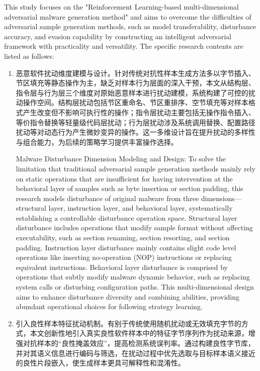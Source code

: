 This study focuses on the "Reinforcement Learning-based multi-dimensional adversarial malware generation method" and aims to overcome the difficulties of adversarial sample generation methods, such as model transferability, disturbance accuracy, and evasion capability by constructing an intelligent adversarial framework with practicality and versatility. The specific research contents are listed as follows:
\begin{enumerate} [label=\arabic*)] 
\item 恶意软件扰动维度建模与设计。针对传统对抗性样本生成方法多以字节插入、节区填充等静态操作为主，缺乏对样本行为层面的深入干预，本文从结构层、指令层与行为层三个维度对原始恶意样本进行扰动建模，系统构建了可控的扰动操作空间。结构层扰动包括节区重命名、节区重排序、空节填充等对样本格式产生改变但不影响可执行性的操作；指令层扰动主要包括无操作指令插入、等价指令替换等轻量级代码层扰动；行为层扰动涉及系统调用替换、配置路径扰动等对动态行为产生微妙变异的操作。这一多维设计旨在提升扰动的多样性与组合能力，为后续的策略学习提供丰富操作选择。

Malware Disturbance Dimension Modeling and Design: To solve the limitation that traditional adversarial sample generation methods mainly rely on static operations that are insufficient for having intervention at the behavioral layer of samples such as byte insertion or section padding, this research models disturbance of original malware from three dimensions—structural layer, instruction layer, and behavioral layer, systematically establishing a controllable disturbance operation space. Structural layer disturbance includes operations that modify sample format without affecting executability, such as section renaming, section resorting, and section padding. Instruction layer disturbance mainly contains slight code level operations like inserting no-operation (NOP) instructions or replacing equivalent instructions. Behavioral layer disturbance is comprised by operations that subtly modify malware dynamic behavior, such as replacing system calls or disturbing configuration paths. This multi-dimensional design aims to enhance disturbance diversity and combining abilities, providing abundant operational choices for following strategy learning.
\item 引入良性样本特征扰动机制。有别于传统使用随机扰动或无效填充字节的方式，本文创新性地引入真实良性软件样本中的特征字节序列作为扰动来源，增强对抗样本的“良性掩盖效应”，提高检测系统误判率。通过构建良性字节库，并对其语义信息进行编码与筛选，在扰动过程中优先选取与目标样本语义接近的良性片段嵌入，使生成样本更具可解释性和混淆性。


\end{enumerate}
